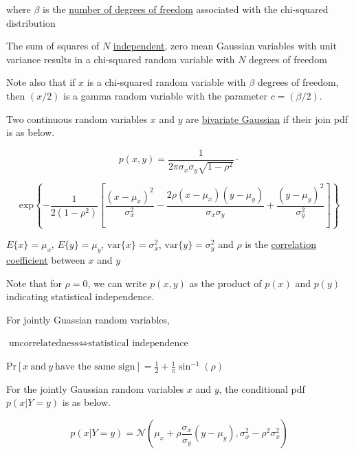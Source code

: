 \documentclass[fleqn]{article}
\begin{document}
\begin{enumerate}
		where $\beta$ is the \underline{number of degrees of freedom} associated with the chi-squared distribution
		
		The sum of squares of $N$ \underline{independent}, zero mean Gaussian variables with unit variance results in a chi-squared random variable with $N$ degrees of freedom
		
		Note also that if $x$ is a chi-squared random variable with $\beta$ degrees of freedom, then $(x/2)$ is a gamma random variable with the parameter \newline $c = (\beta/2)$.
		
	\end{enumerate}
		
	Two continuous random variables $x$ and $y$ are \underline{bivariate Gaussian} if their join pdf is as below.
		
	\begin{equation*}
		p(x,y) = \frac{1}{2\pi\sigma_x\sigma_y\sqrt{1-\rho^2}} \cdot
	\end{equation*}

	\begin{equation*}
		\text{exp}\left\{-\frac{1}{2(1-\rho^2)}\left[\frac{(x-\mu_x)^2}{\sigma_x^2} - \frac{2\rho(x - \mu_x)(y - \mu_y)}{\sigma_x\sigma_y} + \frac{(y - \mu_y)^2}{\sigma_y^2}\right]\right\}
	\end{equation*}
		
	$E\{x\} = \mu_x$, $E\{y\} = \mu_y$, $\text{var}\{x\} = \sigma_x^2$, $\text{var}\{y\} = \sigma_y^2$ and $\rho$ is the \newline \underline{correlation coefficient} between $x$ and $y$
		
	Note that for $\rho = 0$, we can write $p(x,y)$ as the product of $p(x)$ and $p(y)$ indicating statistical independence.
		
	For jointly Guassian random variables,
		
	$\text{uncorrelatedness} \Leftrightarrow \text{statistical independence}$
		
	$\text{Pr}\left[x\ \text{and}\ y\ \text{have the same sign}\right] = \frac{1}{2} + \frac{1}{\pi}\sin^{-1}(\rho)$
		
	For the jointly Gaussian random variables $x$ and $y$, the conditional pdf $p(x|Y=y)$ is as below.
		
	\begin{equation*}
		p(x|Y=y) = \mathcal{N}\left(\mu_x + \rho\frac{\sigma_x}{\sigma_y}(y - \mu_y), \sigma_x^2-\rho^2\sigma_x^2\right)
	\end{equation*}
		
\end{document}
